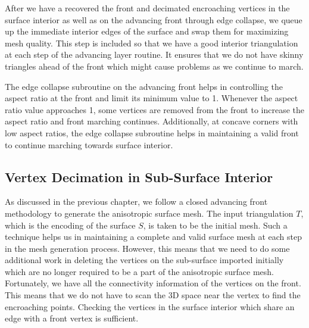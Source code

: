 After we have a recovered the front and decimated encroaching vertices in the surface interior as well as on the advancing front through edge collapse, we queue up the immediate interior edges of the surface and swap them for maximizing mesh quality. This step is included so that we have a good interior triangulation at each step of the advancing layer routine. It ensures that we do not have skinny triangles ahead of the front which might cause problems as we continue to march.

The edge collapse subroutine on the advancing front helps in controlling the aspect ratio at the front and limit its minimum value to 1. Whenever the aspect ratio value approaches 1, some vertices are removed from the front to increase the aspect ratio and  front marching continues. Additionally, at concave corners with low aspect ratios, the edge collapse subroutine helps in maintaining a valid front to continue marching towards surface interior.

\subsection{Vertex Decimation in Sub-Surface Interior}

As discussed in the previous chapter, we follow a closed advancing front methodology to generate the anisotropic surface mesh. The input triangulation $T$, which is the encoding of the surface $S$, is taken to be the initial mesh. Such a technique helps us in maintaining a complete and valid surface mesh at each step in the mesh generation process. However, this means that we need to do some additional work in deleting the vertices on the sub-surface imported initially which are no longer required to be a part of the anisotropic surface mesh. Fortunately, we have all the connectivity information of the vertices on the front. This means that we do not have to scan the 3D space near the vertex to find the encroaching points. Checking the vertices in the surface interior which share an edge with a front vertex is sufficient.

